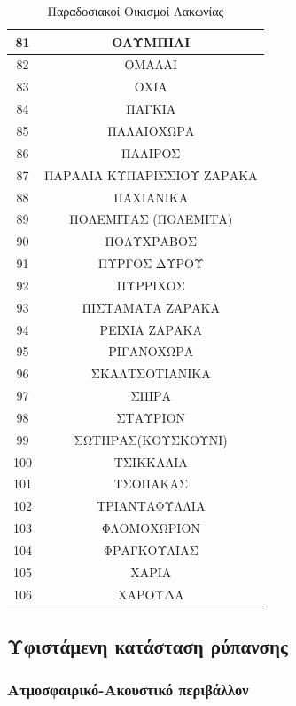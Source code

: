 \documentclass[12pt]{article}
\begin{document}
	\begin{table}[H]
		\centering
		\begin{tabular}{|c|c|}
			\hline
			81 & ΟΛΥΜΠΙΑΙ \\ \hline
			82 & ΟΜΑΛΑΙ \\ \hline
			83 & ΟΧΙΑ \\ \hline
			84 & ΠΑΓΚΙΑ \\ \hline
			85 & ΠΑΛΑΙΟΧΩΡΑ \\ \hline
			86 & ΠΑΛΙΡΟΣ \\ \hline
			87 & ΠΑΡΑΛΙΑ ΚΥΠΑΡΙΣΣΙΟΥ ΖΑΡΑΚΑ \\ \hline
			88 & ΠΑΧΙΑΝΙΚΑ \\ \hline
			89 & ΠΟΛΕΜΙΤΑΣ (ΠΟΛΕΜΙΤΑ) \\ \hline
			90 & ΠΟΛΥΧΡΑΒΟΣ \\ \hline
			91 & ΠΥΡΓΟΣ ΔΥΡΟΥ \\ \hline
			92 & ΠΥΡΡΙΧΟΣ \\ \hline
			93 & ΠΙΣΤΑΜΑΤΑ ΖΑΡΑΚΑ \\ \hline
			94 & ΡΕΙΧΙΑ ΖΑΡΑΚΑ \\ \hline
			95 & ΡΙΓΑΝΟΧΩΡΑ \\ \hline
			96 & ΣΚΑΛΤΣΟΤΙΑΝΙΚΑ \\ \hline
			97 & ΣΠΙΡΑ \\ \hline
			98 & ΣΤΑΥΡΙΟΝ \\ \hline
			99 & ΣΩΤΗΡΑΣ(ΚΟΥΣΚΟΥΝΙ) \\ \hline
			100 & ΤΣΙΚΚΑΛΙΑ \\ \hline
			101 & ΤΣΟΠΑΚΑΣ \\ \hline
			102 & ΤΡΙΑΝΤΑΦΥΛΛΙΑ \\ \hline
			103 & ΦΛΟΜΟΧΩΡΙΟΝ \\ \hline
			104 & ΦΡΑΓΚΟΥΛΙΑΣ \\ \hline
			105 & ΧΑΡΙΑ \\ \hline
			106 & ΧΑΡΟΥΔΑ \\ \hline
		\end{tabular}
		\caption{Παραδοσιακοί Οικισμοί Λακωνίας}
		\label{The label}
	\end{table}
	
	\subsection{Υφιστάμενη κατάσταση ρύπανσης}
	
	\subsubsection{Ατμοσφαιρικό-Ακουστικό περιβάλλον}
	
\end{document}
